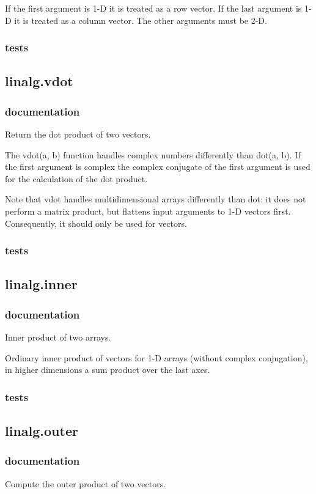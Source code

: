 \documentclass[a4paper,11pt]{article}
\begin{document}
If the first argument is 1-D it is treated as a row vector. If the last argument is 1-D it is treated as a column vector. The other arguments must be 2-D.
\subsubsection{tests}

\subsection{linalg.vdot}

\subsubsection{documentation}
Return the dot product of two vectors.

The vdot(a, b) function handles complex numbers differently than dot(a, b). If the first argument is complex the complex conjugate of the first argument is used for the calculation of the dot product.

Note that vdot handles multidimensional arrays differently than dot: it does not perform a matrix product, but flattens input arguments to 1-D vectors first. Consequently, it should only be used for vectors.
\subsubsection{tests}

\subsection{linalg.inner}
\subsubsection{documentation}
Inner product of two arrays.

Ordinary inner product of vectors for 1-D arrays (without complex conjugation), in higher dimensions a sum product over the last axes.

\subsubsection{tests}
\subsection{linalg.outer}
\subsubsection{documentation}
Compute the outer product of two vectors.
\end{document}
